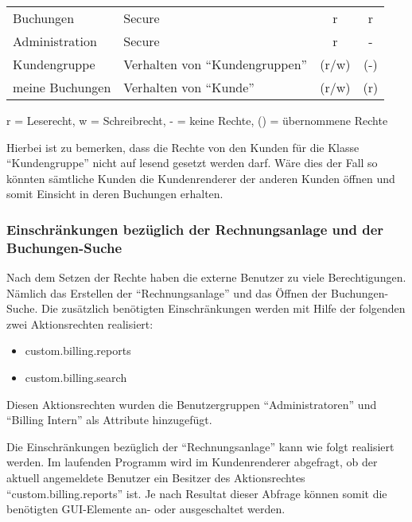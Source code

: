 \begin{minipage}{\linewidth}
\centering
{} \label{tab:katalogrechte}
\begin{tabulary}{\textwidth}{|l|L|C|c|}
 \hline
  &  &  &  \tabularnewline
 \hline 
 Buchungen & Secure & r & r \\ 
 \hline 
 Administration & Secure &r & - \\ 
 \hline 
 Kundengruppe & Verhalten von "`Kundengruppen"' & (r/w) & (-) \\ 
 \hline 
 meine Buchungen & Verhalten von "`Kunde"' & (r/w) & (r) \\ 
 \hline 
 \end{tabulary}
 \par
 \bigskip
 r = Leserecht, w = Schreibrecht, - = keine Rechte, () = übernommene Rechte
 \end{minipage}
 
Hierbei ist zu bemerken, dass die Rechte von den Kunden für die Klasse "`Kundengruppe"' nicht auf lesend gesetzt werden darf. Wäre dies der Fall so könnten sämtliche Kunden die Kundenrenderer der anderen Kunden öffnen und somit Einsicht in deren Buchungen erhalten.

\subsubsection{Einschränkungen bezüglich der Rechnungsanlage und der Buchungen-Suche}

Nach dem Setzen der Rechte haben die externe Benutzer zu viele Berechtigungen.
Nämlich das Erstellen der \enquote{Rechnungsanlage} und das Öffnen der Buchungen-Suche.
Die zusätzlich benötigten Einschränkungen werden mit Hilfe der folgenden zwei Aktionsrechten realisiert:
\begin{itemize}
\item custom.billing.reports
\item custom.billing.search
\end{itemize}
Diesen Aktionsrechten wurden die Benutzergruppen "`Administratoren"' und "`Billing Intern"' als Attribute hinzugefügt.

Die Einschränkungen bezüglich der \enquote{Rechnungsanlage} kann wie folgt realisiert werden.
Im laufenden Programm wird im Kundenrenderer abgefragt, ob der aktuell angemeldete Benutzer ein Besitzer des Aktionsrechtes "`custom.billing.reports"' ist.
Je nach Resultat dieser Abfrage können somit die benötigten GUI-Elemente an- oder ausgeschaltet werden.

